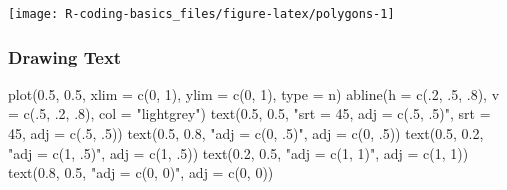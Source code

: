 \documentclass[
]{book}
\newenvironment{Shaded}{\begin{snugshade}}{\end{snugshade}}
\newcommand{\AttributeTok}[1]{\textcolor[rgb]{0.77,0.63,0.00}{#1}}
\newcommand{\DecValTok}[1]{\textcolor[rgb]{0.00,0.00,0.81}{#1}}
\newcommand{\FloatTok}[1]{\textcolor[rgb]{0.00,0.00,0.81}{#1}}
\newcommand{\FunctionTok}[1]{\textcolor[rgb]{0.00,0.00,0.00}{#1}}
\newcommand{\NormalTok}[1]{#1}
\newcommand{\StringTok}[1]{\textcolor[rgb]{0.31,0.60,0.02}{#1}}
\begin{document}
\begin{center}\texttt{[image: R-coding-basics\_files/figure-latex/polygons-1]} \end{center}

\hypertarget{drawing-text}{%
\subsubsection*{Drawing Text}\label{drawing-text}}

\begin{Shaded}
\begin{Highlighting}[]
\FunctionTok{plot}\NormalTok{(}\FloatTok{0.5}\NormalTok{, }\FloatTok{0.5}\NormalTok{, }\AttributeTok{xlim =} \FunctionTok{c}\NormalTok{(}\DecValTok{0}\NormalTok{, }\DecValTok{1}\NormalTok{), }\AttributeTok{ylim =} \FunctionTok{c}\NormalTok{(}\DecValTok{0}\NormalTok{, }\DecValTok{1}\NormalTok{), }\AttributeTok{type =} \StringTok{\textquotesingle{}n\textquotesingle{}}\NormalTok{)}
\FunctionTok{abline}\NormalTok{(}\AttributeTok{h =} \FunctionTok{c}\NormalTok{(.}\DecValTok{2}\NormalTok{, .}\DecValTok{5}\NormalTok{, .}\DecValTok{8}\NormalTok{),}
       \AttributeTok{v =} \FunctionTok{c}\NormalTok{(.}\DecValTok{5}\NormalTok{, .}\DecValTok{2}\NormalTok{, .}\DecValTok{8}\NormalTok{), }\AttributeTok{col =} \StringTok{"lightgrey"}\NormalTok{)}
\FunctionTok{text}\NormalTok{(}\FloatTok{0.5}\NormalTok{, }\FloatTok{0.5}\NormalTok{, }\StringTok{"srt = 45, adj = c(.5, .5)"}\NormalTok{,}
     \AttributeTok{srt =} \DecValTok{45}\NormalTok{, }\AttributeTok{adj =} \FunctionTok{c}\NormalTok{(.}\DecValTok{5}\NormalTok{, .}\DecValTok{5}\NormalTok{))}
\FunctionTok{text}\NormalTok{(}\FloatTok{0.5}\NormalTok{, }\FloatTok{0.8}\NormalTok{, }\StringTok{"adj = c(0, .5)"}\NormalTok{, }\AttributeTok{adj =} \FunctionTok{c}\NormalTok{(}\DecValTok{0}\NormalTok{, .}\DecValTok{5}\NormalTok{))}
\FunctionTok{text}\NormalTok{(}\FloatTok{0.5}\NormalTok{, }\FloatTok{0.2}\NormalTok{, }\StringTok{"adj = c(1, .5)"}\NormalTok{, }\AttributeTok{adj =} \FunctionTok{c}\NormalTok{(}\DecValTok{1}\NormalTok{, .}\DecValTok{5}\NormalTok{))}
\FunctionTok{text}\NormalTok{(}\FloatTok{0.2}\NormalTok{, }\FloatTok{0.5}\NormalTok{, }\StringTok{"adj = c(1, 1)"}\NormalTok{, }\AttributeTok{adj =} \FunctionTok{c}\NormalTok{(}\DecValTok{1}\NormalTok{, }\DecValTok{1}\NormalTok{))}
\FunctionTok{text}\NormalTok{(}\FloatTok{0.8}\NormalTok{, }\FloatTok{0.5}\NormalTok{, }\StringTok{"adj = c(0, 0)"}\NormalTok{, }\AttributeTok{adj =} \FunctionTok{c}\NormalTok{(}\DecValTok{0}\NormalTok{, }\DecValTok{0}\NormalTok{))}
\end{Highlighting}
\end{Shaded}
\end{document}
